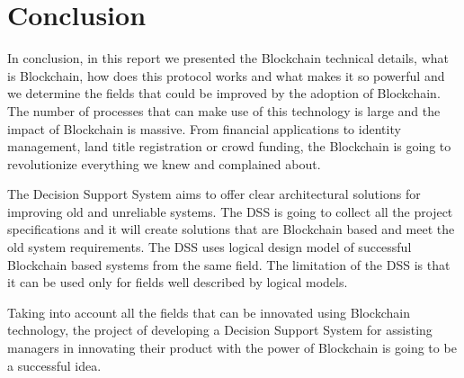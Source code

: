 \chapter{Conclusion}
\label{chapter:conclusion}
In conclusion, in this report we presented the Blockchain technical details, what is Blockchain, how does this protocol works and what makes it so powerful and we determine the fields that could be improved by the adoption of Blockchain. The number of processes that can make use of this technology is large and the impact of Blockchain is massive.
From financial applications to identity management, land title registration or crowd funding, the Blockchain is going to revolutionize everything we knew and complained about.

The Decision Support System aims to offer clear architectural solutions for improving old and unreliable systems. The DSS is going to collect all the project specifications and it will create solutions that are Blockchain based and meet the old system requirements. The DSS uses logical design model of successful Blockchain based systems from the same field. The limitation of the DSS is that it can be used only for fields well described by logical models.

Taking into account all the fields that can be innovated using Blockchain technology, the project of developing a Decision Support System for assisting managers in innovating their product with the power of Blockchain is going to be a successful idea.